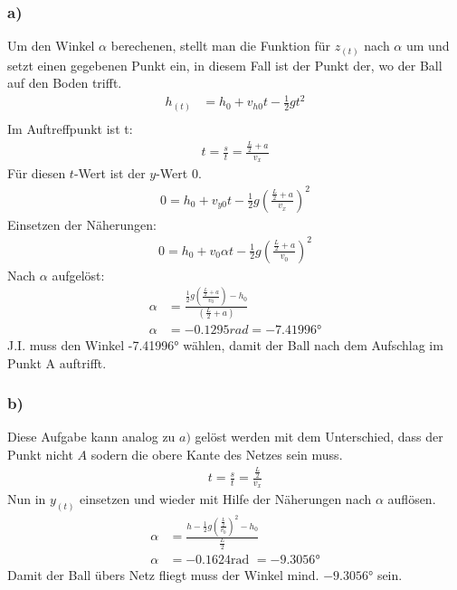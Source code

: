 \documentclass[a4paper,11pt]{article}
\begin{document}
    \subsubsection*{a)}
        Um den Winkel $\alpha$ berechenen, stellt man die Funktion für $z_{(t)}$ nach $\alpha$ um und setzt einen gegebenen Punkt ein, in diesem Fall ist der Punkt der, wo der Ball auf den Boden trifft.
        \begin{align*}
          h_{(t)}&=h_0+v_{h0}t-\frac{1}{2}gt^2 \\
        \end{align*}
        Im Auftreffpunkt ist t:
        \begin{align*}
          t=\frac{s}{t}=\frac{\frac{L}{2}+a}{v_x}
        \end{align*}
        Für diesen $t$-Wert ist der $y$-Wert 0.
        \begin{align*}
          0=h_0+v_{y0}t-\frac{1}{2}g\left(\frac{\frac{L}{2}+a}{v_x}\right)^2
        \end{align*}
        Einsetzen der Näherungen:
        \begin{align*}
          0=h_0+v_0\alpha t-\frac{1}{2}g\left(\frac{\frac{L}{2}+a}{v_0}\right)^2
        \end{align*}
        Nach $\alpha$ aufgelöst:
         \begin{align*}
          \alpha &= \frac{\frac{1}{2}g\left(\frac{\frac{L}{2}+a}{v_0}\right)-h_0}{\left(\frac{L}{2}+a\right)} \\
          \alpha &= -0.1295 rad = \ang{-7.41996}
        \end{align*}
        J.I. muss den Winkel \ang{-7.41996} wählen, damit der Ball nach dem Aufschlag im Punkt A auftrifft.
      \subsubsection*{b)}
        Diese Aufgabe kann analog zu $a)$ gelöst werden mit dem Unterschied, dass der Punkt nicht $A$ sodern die obere Kante des Netzes sein muss.
        \begin{align*}
          t=\frac{s}{t}=\frac{\frac{L}{2}}{v_x}
        \end{align*}
        Nun in $y_{(t)}$ einsetzen und wieder mit Hilfe der Näherungen nach $\alpha$ auflösen.
        \begin{align*}
          \alpha &= \frac{h-\frac{1}{2}g\left(\frac{\frac{L}{2}}{v_0}\right)^2-h_0}{\frac{L}{2}} \\
          \alpha &= -0.1624 \mbox{rad } = \ang{-9.3056}
        \end{align*}
        Damit der Ball übers Netz fliegt muss der Winkel mind. $\ang{-9.3056}$ sein.
\end{document}
